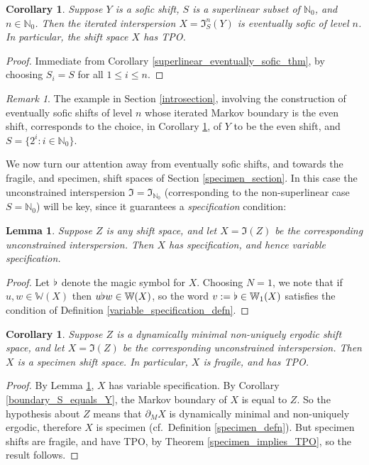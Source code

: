 \documentclass[reqno,11pt]{amsart}
\newtheorem{lem}[thm]{Lemma}
\newtheorem{cor}[thm]{Corollary}
\theoremstyle{definition}
\theoremstyle{remark}
\theoremstyle{remark}
\newtheorem{rem}[thm]{Remark}
\def \N {\mathbb N}
\def\w{\mathbb{W}}
\def\i{\mathfrak{I}}
\def\b{\kern 0.02em \flat \kern 0.02em}
\numberwithin{equation}{section}
\begin{document}
\begin{cor}\label{superlinear_eventually_sofic_cor}
Suppose $Y$ is a sofic shift, $S$ is a superlinear subset of $\N_0$, and $n\in\N_0$. Then
the iterated interspersion $X= \i_S^n(Y)$ is eventually sofic of level $n$.
In particular, the shift space $X$ has TPO.
\end{cor}
\begin{proof}
Immediate from Corollary \ref{superlinear_eventually_sofic_thm}, by choosing $S_i=S$ for all $1\le i\le n$.
\end{proof}

\begin{rem}
The example in Section \ref{introsection}, involving the construction of eventually sofic shifts of level $n$ whose iterated
Markov boundary is the even shift, corresponds to the choice, in Corollary \ref{superlinear_eventually_sofic_cor},
of $Y$ to be the even shift, and $S=\{2^i:i\in\N_0\}$.
\end{rem}


We now turn our attention away from eventually sofic shifts, and towards the fragile,
and specimen, shift spaces of Section \ref{specimen_section}.
In this case the unconstrained interspersion $\i=\i_{\N_0}$ 
(corresponding to the non-superlinear case $S=\N_0$) will be key,
since it guarantees a \emph{specification} condition:



\begin{lem}\label{unconstrained_interspersion_implies_specification}
Suppose $Z$ is any shift space, and let $X=\i(Z)$ be the corresponding unconstrained interspersion.
Then $X$ has specification, and hence variable specification.
\end{lem}
\begin{proof}
Let $\b$ denote the magic symbol 
for $X$.
Choosing $N=1$, 
we note that if
$u,w\in \w(X)$ then 
 $u\b w\in\w(X)$,
so the word $v:=\b\in \w_1(X)$ satisfies the condition of Definition \ref{variable_specification_defn}.
\end{proof}

\begin{cor}\label{Z_min_nue_interspersion_specimen}
Suppose $Z$ is a dynamically minimal non-uniquely ergodic shift space, and let $X=\i(Z)$ be the corresponding unconstrained interspersion.
Then $X$ is a specimen shift space.
In particular, $X$ is fragile, and has TPO.
\end{cor}
\begin{proof}
By Lemma \ref{unconstrained_interspersion_implies_specification}, $X$ has variable specification.
By Corollary \ref{boundary_S_equals_Y}, the Markov boundary of $X$ is equal to $Z$.
So the hypothesis about $Z$ means that $\partial_M X$ is
dynamically minimal and non-uniquely ergodic, therefore $X$ is specimen
(cf.~Definition \ref{specimen_defn}).
But specimen shifts are fragile, and have TPO, by Theorem \ref{specimen_implies_TPO}, so the result follows.
\end{proof}
\end{document}
